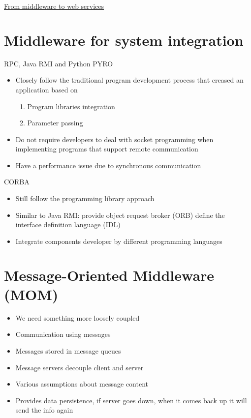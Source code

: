 \documentclass{article}[18pt]
\begin{document}
\begin{center}
\underline{\huge From middleware to web services}
\end{center}
\section{Middleware for system integration}
RPC, Java RMI and Python PYRO
\begin{itemize}
	\item Closely follow the traditional program development process that creased an application based on 
	\begin{enumerate}
		\item Program libraries integration
		\item Parameter passing
	\end{enumerate}
	\item Do not require developers to deal with socket programming when implementing programs that support remote communication
	\item Have a performance issue due to synchronous communication
\end{itemize}
CORBA
\begin{itemize}
	\item Still follow the programming library approach
	\item Similar to Java RMI: provide object request broker (ORB) define the interface definition language (IDL)
	\item Integrate components developer by different programming languages
\end{itemize}
\section{Message-Oriented Middleware (MOM)}
\begin{itemize}
	\item We need something more loosely coupled
	\item Communication using messages
	\item Messages stored in message queues
	\item Message servers decouple client and server
	\item Various assumptions about message content
	\item Provides data persistence, if server goes down, when it comes back up it will send the info again
	
\end{itemize}
\end{document}
